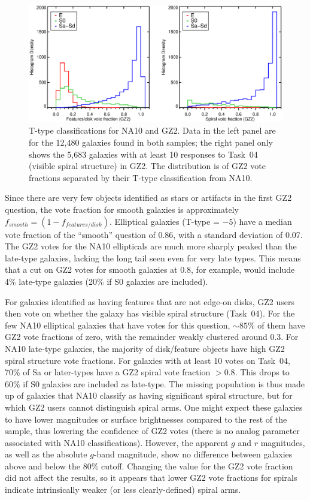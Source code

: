 \documentclass[useAMS,usenatbib]{mn2e}
\begin{document}
\begin{figure}
\includegraphics[angle=0,width=7.0in]{figures/na_ttype.eps}
\caption{T-type classifications for NA10 and GZ2. Data in the left panel are for the 12,480 galaxies found in both samples; the right panel only shows the 5,683 galaxies with at least 10 responses to Task~04 (visible spiral structure) in GZ2. The distribution is of GZ2 vote fractions separated by their T-type classification from NA10. 
\label{fig-na_ttype}}
\end{figure}

Since there are very few objects identified as stars or artifacts in the first GZ2 question, the vote fraction for smooth galaxies is approximately $f_{smooth} = (1 - f_{features/disk})$. Elliptical galaxies (T-type = $-5$) have a median vote fraction of the ``smooth'' question of 0.86, with a standard deviation of 0.07. The GZ2 votes for the NA10 ellipticals are much more sharply peaked than the late-type galaxies, lacking the long tail seen even for very late types. This means that a cut on GZ2 votes for smooth galaxies at 0.8, for example, would include 4\% late-type galaxies (20\% if S0 galaxies are included). 

For galaxies identified as having features that are not edge-on disks, GZ2 users then vote on whether the galaxy has visible spiral structure (Task~04). For the few NA10 elliptical galaxies that have votes for this question, $\sim85\%$ of them have GZ2 vote fractions of zero, with the remainder weakly clustered around 0.3. For NA10 late-type galaxies, the majority of disk/feature objects have high GZ2 spiral structure vote fractions. For galaxies with at least 10 votes on Task~04, 70\% of Sa or later-types have a GZ2 spiral vote fraction $>0.8$. This drops to 60\% if S0 galaxies are included as late-type. The missing population is thus made up of galaxies that NA10 classify as having significant spiral structure, but for which GZ2 users cannot distinguish spiral arms. One might expect these galaxies to have lower magnitudes or surface brightnesses compared to the rest of the sample, thus lowering the confidence of GZ2 votes (there is no analog parameter associated with NA10 classifications). However, the apparent $g$ and $r$ magnitudes, as well as the absolute $g$-band magnitude, show no difference between galaxies above and below the 80\% cutoff. Changing the value for the GZ2 vote fraction did not affect the results, so it appears that lower GZ2 vote fractions for spirals indicate intrinsically weaker (or less clearly-defined) spiral arms.
\end{document}
